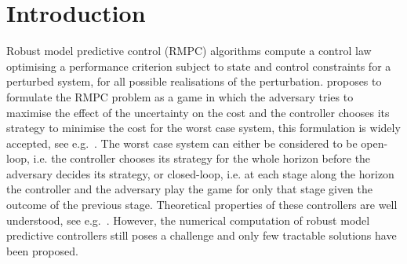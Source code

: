 \documentclass{ifacconf}
\begin{document}
\section{Introduction}\label{sec:intro}
Robust model predictive control (RMPC) algorithms compute a control law optimising a performance
criterion subject to state and control constraints for a perturbed system, for all possible realisations of the
perturbation. \cite{Witsenhausen:1968} proposes to formulate the RMPC problem as a game in which the adversary 
tries to maximise the effect of the uncertainty on the cost and the controller chooses its strategy to minimise 
the cost for the worst case system, this formulation is widely accepted, see e.g.~\cite{Bemporad:1999,Bemporad:2003,Lee:1997}.
The worst case system can either be considered to be open-loop, i.e. the controller chooses its strategy for the 
whole horizon before the adversary decides its strategy, or closed-loop, i.e. at each stage along the horizon 
the controller and the adversary play the game for only that stage given the outcome of the previous stage.
Theoretical properties of these controllers are well understood, see e.g.~\cite{Mayne:2000}. However, the
numerical computation of robust model predictive controllers still poses a challenge and only few tractable 
solutions have been proposed.
\end{document}
